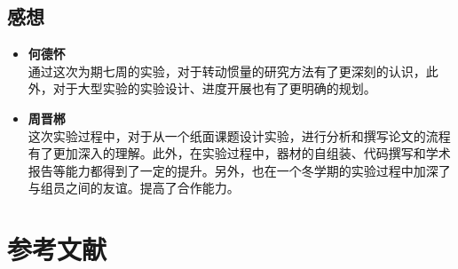 \documentclass[12pt,hyperref,a4paper,UTF8]{ctexart}
\begin{document}
\subsection{感想}
\begin{itemize}
    \item \textbf{何德怀} \\
    通过这次为期七周的实验，对于转动惯量的研究方法有了更深刻的认识，此外，对于大型实验的实验设计、进度开展也有了更明确的规划。
    \item \textbf{周晋郴} \\
    这次实验过程中，对于从一个纸面课题设计实验，进行分析和撰写论文的流程有了更加深入的理解。此外，在实验过程中，器材的自组装、代码撰写和学术报告等能力都得到了一定的提升。另外，也在一个冬学期的实验过程中加深了与组员之间的友谊。提高了合作能力。

\end{itemize}

\section{参考文献}

\end{document}

